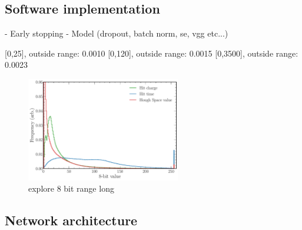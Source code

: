 \subsection{Software implementation} %
\label{sec:cvn_baseline_soft} %

- Early stopping
- Model (dropout, batch norm, se, vgg etc...)

[0,25], outside range: 0.0010
    [0,120], outside range: 0.0015
    [0,3500], outside range: 0.0023

\begin{figure} %
    \includegraphics[width=0.6\textwidth]{diagrams/7-cvn/chipsnet/explore_8_bit_range.pdf}
    \caption[explore 8 bit range short]
    {explore 8 bit range long}
    \label{fig:explore_8_bit_range}
\end{figure}

\subsection{Network architecture} %
\label{sec:cvn_baseline_architecture} %

